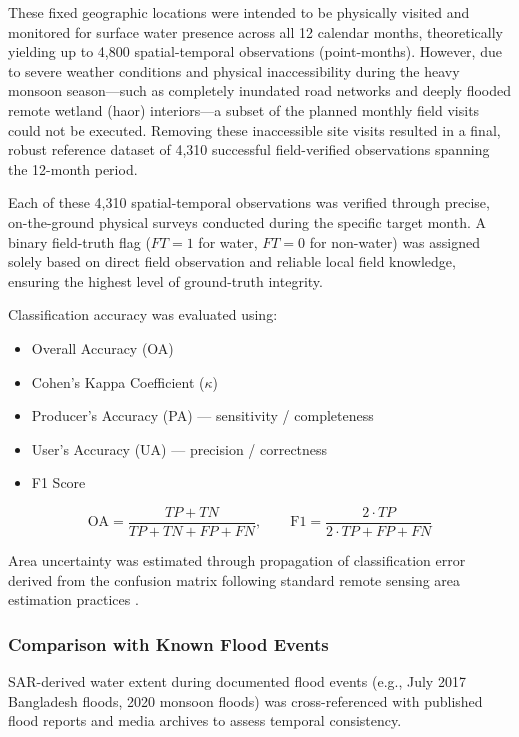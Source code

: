 \documentclass[fleqn,10pt]{article}
\begin{document}
These fixed geographic locations were intended to be physically visited and monitored for surface water presence across all 12 calendar months, theoretically yielding up to 4,800 spatial-temporal observations (point-months). However, due to severe weather conditions and physical inaccessibility during the heavy monsoon season—such as completely inundated road networks and deeply flooded remote wetland (haor) interiors—a subset of the planned monthly field visits could not be executed. Removing these inaccessible site visits resulted in a final, robust reference dataset of 4,310 successful field-verified observations spanning the 12-month period.

Each of these 4,310 spatial-temporal observations was verified through precise, on-the-ground physical surveys conducted during the specific target month. A binary field-truth flag ($FT = 1$ for water, $FT = 0$ for non-water) was assigned solely based on direct field observation and reliable local field knowledge, ensuring the highest level of ground-truth integrity.

Classification accuracy was evaluated using:
\begin{itemize}[nosep]
  \item Overall Accuracy (OA)
  \item Cohen's Kappa Coefficient ($\kappa$)
  \item Producer's Accuracy (PA) --- sensitivity / completeness
  \item User's Accuracy (UA) --- precision / correctness
  \item F1 Score
\end{itemize}

\begin{equation}
\text{OA} = \frac{TP + TN}{TP + TN + FP + FN}, \qquad
\text{F1} = \frac{2 \cdot TP}{2 \cdot TP + FP + FN}
\label{eq:accuracy}
\end{equation}

Area uncertainty was estimated through propagation of classification error derived from the confusion matrix following standard remote sensing area estimation practices \cite{olofsson2014}.

\subsubsection{Comparison with Known Flood Events}
SAR-derived water extent during documented flood events (e.g., July 2017 Bangladesh floods, 2020 monsoon floods) was cross-referenced with published flood reports and media archives to assess temporal consistency.
\end{document}
